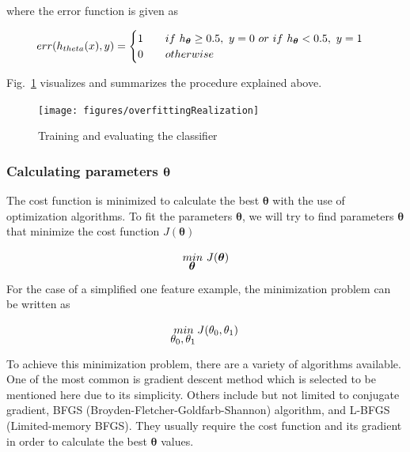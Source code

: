 \begin{enumerate}
	where the error function is given as

	\begin{equation}{\label{eqn:misclassificationError}}
	  err(h_{theta}(x),y)=\begin{cases}
               1 \qquad if\ h_{{\bm{\theta}}}\geq0.5,\ y=0 \ or\ if \ h_{{\bm{\theta}}} < 0.5, \ y=1\\
               0 \qquad otherwise\\
            \end{cases}
	\end{equation} 

\end{enumerate}

Fig.~\ref{fig:trainingAndEvaluation} visualizes and summarizes the procedure explained above.

\begin{landscape}
\begin{figure}
\begin{center}
\texttt{[image: figures/overfittingRealization]}    %
\caption{Training and evaluating the classifier} 
\label{fig:trainingAndEvaluation}
\end{center}
\end{figure}
\end{landscape}


\subsubsection{Calculating parameters $\bm{\theta}$}

The cost function is minimized to calculate the best $\bm{\theta}$ with the use of optimization algorithms. To fit the parameters $\bm{\theta}$, we will try to find parameters $\bm{\theta}$ that minimize the cost function $J({\bm{\theta}})$

\begin{equation}{\label{eqn:optimizationGoal}}
\underaccent{{\displaystyle \bm{\theta}}}{min} \ J(\bm{\theta})
\end{equation} 

For the case of a simplified one feature example, the minimization problem can be written as

\begin{equation}{\label{eqn:optimizationGoalSimplified}}
\underaccent{{\displaystyle \theta_0, \theta_1}}{min} \ J(\theta_0,\theta_1)
\end{equation} 

To achieve this minimization problem, there are a variety of algorithms available. 
One of the most common is gradient descent method which is selected to be mentioned here due to its simplicity.  
Others include but not limited to conjugate gradient, BFGS (Broyden-Fletcher-Goldfarb-Shannon) algorithm, and L-BFGS (Limited-memory BFGS). 
They usually require the cost function and its gradient in order to calculate the best $\bm{\theta}$ values.

